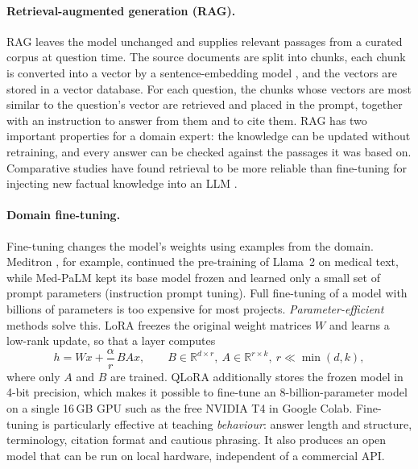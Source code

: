 \paragraph{Retrieval-augmented generation (RAG).} RAG \cite{lewis2020} leaves the model unchanged and supplies relevant passages from a curated corpus at question time. The source documents are split into chunks, each chunk is converted into a vector by a sentence-embedding model \cite{reimers2019}, and the vectors are stored in a vector database. For each question, the chunks whose vectors are most similar to the question's vector are retrieved and placed in the prompt, together with an instruction to answer from them and to cite them. RAG has two important properties for a domain expert: the knowledge can be updated without retraining, and every answer can be checked against the passages it was based on. Comparative studies have found retrieval to be more reliable than fine-tuning for injecting new factual knowledge into an LLM \cite{ovadia2024}.

\paragraph{Domain fine-tuning.} Fine-tuning changes the model's weights using examples from the domain. Meditron \cite{chen2023meditron}, for example, continued the pre-training of Llama~2 on medical text, while Med-PaLM \cite{singhal2023} kept its base model frozen and learned only a small set of prompt parameters (instruction prompt tuning). Full fine-tuning of a model with billions of parameters is too expensive for most projects. \emph{Parameter-efficient} methods solve this. LoRA \cite{hu2022lora} freezes the original weight matrices $W$ and learns a low-rank update, so that a layer computes
\begin{equation}
  h = W x + \frac{\alpha}{r}\, B A x, \qquad B \in \mathbb{R}^{d \times r},\ A \in \mathbb{R}^{r \times k},\ r \ll \min(d,k),
\end{equation}
where only $A$ and $B$ are trained. QLoRA \cite{dettmers2023qlora} additionally stores the frozen model in 4-bit precision, which makes it possible to fine-tune an 8-billion-parameter model on a single 16\,GB GPU such as the free NVIDIA T4 in Google Colab. Fine-tuning is particularly effective at teaching \emph{behaviour}: answer length and structure, terminology, citation format and cautious phrasing. It also produces an open model that can be run on local hardware, independent of a commercial API.


